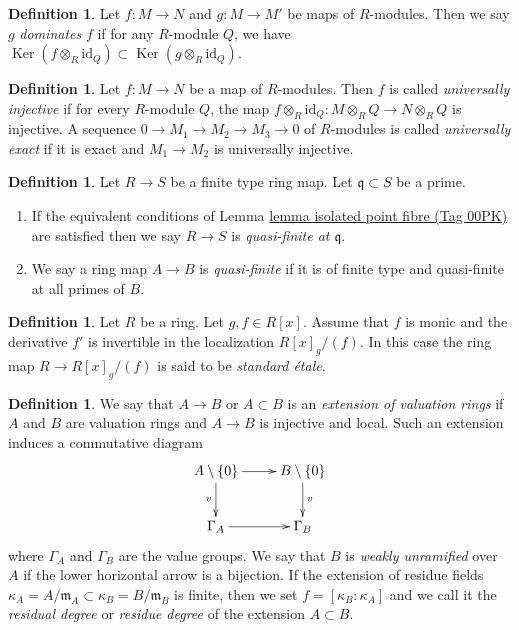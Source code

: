 \documentclass{amsart}
\theoremstyle{plain}
\theoremstyle{definition}
\newtheorem{definition}[subsection]{Definition}
\theoremstyle{remark}
\numberwithin{equation}{subsection}
\def\Ker{\mathop{\mathrm{Ker}}}
\begin{document}
\begin{definition}
\label{algebra-definition-domination}
Let $f: M \to N$ and $g: M \to M'$ be maps of $R$-modules.
Then we say $g$ {\it dominates} $f$ if for any $R$-module $Q$, we have $\Ker(f
\otimes_R \text{id}_Q) \subset \Ker(g \otimes_R \text{id}_Q)$.
\end{definition}

\begin{definition}
\label{algebra-definition-universally-injective}
Let $f: M \to N$ be a map of $R$-modules.  Then $f$ is called
{\it universally injective} if for every $R$-module $Q$, the map $f
\otimes_R \text{id}_Q: M \otimes_R Q \to N \otimes_R Q$
is injective.  A sequence $0 \to M_1 \to M_2 \to M_3
\to 0$ of $R$-modules is called {\it universally exact} if it is exact
and $M_1 \to M_2$ is universally injective.
\end{definition}

\begin{definition}
\label{algebra-definition-quasi-finite}
Let $R \to S$ be a finite type ring map.
Let $\mathfrak q \subset S$ be a prime.
\begin{enumerate}
\item If the equivalent conditions of Lemma \href{https://stacks.math.columbia.edu/tag/00PK}{lemma isolated point fibre (Tag 00PK)}
are satisfied then we say $R \to S$ is {\it quasi-finite at $\mathfrak q$}.
\item We say a ring map $A \to B$ is {\it quasi-finite}
if it is of finite type and quasi-finite at all primes of $B$.
\end{enumerate}
\end{definition}

\begin{definition}
\label{algebra-definition-standard-etale}
Let $R$ be a ring. Let $g , f  \in R[x]$.
Assume that $f$ is monic and the derivative $f'$ is invertible in
the localization $R[x]_g/(f)$.
In this case the ring map $R \to R[x]_g/(f)$ is said to be
{\it standard \'etale}.
\end{definition}

\begin{definition}
\label{more-algebra-definition-extension-valuation-rings}
We say that $A \to B$ or $A \subset B$ is an
{\it extension of valuation rings} if $A$ and $B$ are
valuation rings and $A \to B$ is injective and local.
Such an extension induces a commutative diagram
$$
\xymatrix{
A \setminus \{0\} \ar[r] \ar[d]_v & B \setminus \{0\} \ar[d]^v \\
\Gamma_A \ar[r] & \Gamma_B
}
$$
where $\Gamma_A$ and $\Gamma_B$ are the value groups.
We say that $B$ is {\it weakly unramified} over $A$ if
the lower horizontal arrow is a bijection.
If the extension of residue fields
$\kappa_A = A/\mathfrak m_A \subset \kappa_B = B/\mathfrak m_B$
is finite, then we set $f = [\kappa_B : \kappa_A]$ and we
call it the {\it residual degree} or {\it residue degree}
of the extension $A \subset B$.
\end{definition}
\end{document}

